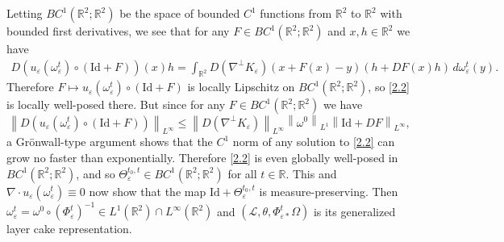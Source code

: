 \documentclass[reqno,centertags,12pt]{amsart}
\theoremstyle{definition}
\numberwithin{equation}{section}
\newcommand{\norm}[1]{\left\|#1\right\|}
\newcommand{\bbR}{{\mathbb{R}}}
\newcommand{\eps}{\varepsilon}
\begin{document}
Letting $BC^{1}(\bbR^{2};\bbR^{2})$ be the space of bounded $C^{1}$ functions from $\bbR^{2}$ to $\bbR^{2}$ with bounded first derivatives, we see that for any $F\in BC^{1}(\bbR^{2};\bbR^{2})$ and $x,h\in\bbR^{2}$ we have
\begin{align*}
    D(u_{\eps}(\omega_{\eps}^{t})\circ(\mathrm{Id} + F))(x)h
    = \int_{\bbR^{2}}D(\nabla^{\perp}K_{\eps})(x + F(x) - y)(h + DF(x)h)
    \,d\omega_{\eps}^{t}(y).
\end{align*}
Therefore
$F\mapsto u_{\eps}(\omega_{\eps}^{t})\circ(\mathrm{Id} + F)$
is locally Lipschitz on $BC^{1}(\bbR^{2};\bbR^{2})$, so
\eqref{2.2} is locally well-posed there.
But since for any $F\in BC^{1}(\bbR^{2};\bbR^{2})$ we have
\[
    \norm{D(u_{\eps}(\omega_{\eps}^{t})\circ(\mathrm{Id} + F))}_{L^{\infty}}
    \leq \norm{D(\nabla^{\perp}K_{\eps})}_{L^{\infty}}\norm{\omega^{0}}_{L^{1}}
    \norm{\mathrm{Id} + DF}_{L^{\infty}},
\]
a Gr\"{o}nwall-type argument shows that the $C^{1}$ norm of any solution to \eqref{2.2}
can grow no faster than exponentially.  Therefore \eqref{2.2} is even globally well-posed in $BC^{1}(\bbR^{2};\bbR^{2})$, and so $\Theta_{\eps}^{t_{0},t}\in BC^{1}(\bbR^{2};\bbR^{2})$
for all $t\in\bbR$.  This and $\nabla \cdot u_{\eps}(\omega_{\eps}^{t}) \equiv 0$ now show that the map  $\mathrm{Id} + \Theta_{\eps}^{t_{0},t}$ is measure-preserving. Then $\omega_{\eps}^{t}=\omega^{0}\circ(\Phi_{\eps}^{t})^{-1}\in L^1(\bbR^2)\cap L^\infty(\bbR^2)$ and  $(\mathcal{L},\theta,\Phi_{\eps*}^{t}\Omega)$ is its generalized layer cake representation.
\end{document}
